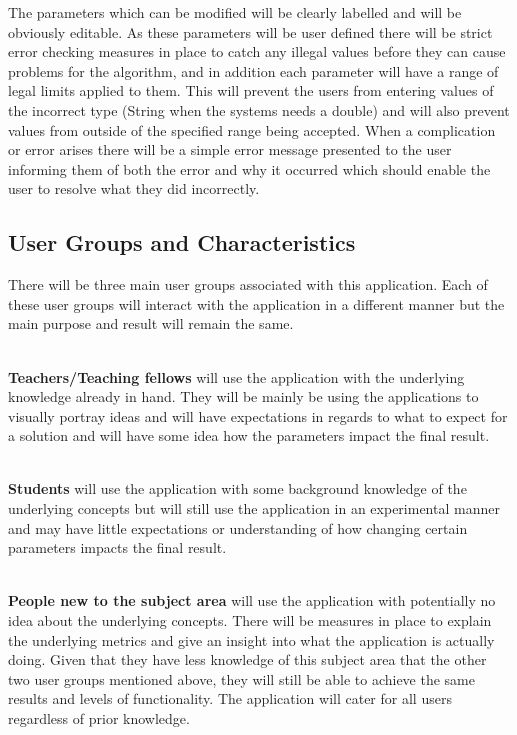 \documentclass[10pt,a4paper]{article}
\begin{document}
The parameters which can be modified will be clearly labelled and will be obviously editable. As these parameters will be user defined there will be strict error checking measures in place to catch any illegal values before they can cause problems for the algorithm, and in addition each parameter will have a range of legal limits applied to them. This will prevent the users from entering values of the incorrect type (String when the systems needs a double) and will also prevent values from outside of the specified range being accepted. When a complication or error arises there will be a simple error message presented to the user informing them of both the error and why it occurred which should enable the user to resolve what they did incorrectly.

\subsection{User Groups and Characteristics}

There will be three main user groups associated with this application. Each of these user groups will interact with the application in a different manner but the main purpose and result will remain the same.

\noindent \\
\textbf{Teachers/Teaching fellows} will use the application with the underlying knowledge already in hand. They will be mainly be using the applications to visually portray ideas and will have expectations in regards to what to expect for a solution and will have some idea how the parameters impact the final result.

\noindent \\
\textbf{Students} will use the application with some background knowledge of the underlying concepts but will still use the application in an experimental manner and may have little expectations or understanding of how changing certain parameters impacts the final result. 

\noindent \\
\textbf{People new to the subject area} will use the application with potentially no idea about the underlying concepts. There will be measures in place to explain the underlying metrics and give an insight into what the application is actually doing. Given that they have less knowledge of this subject area that the other two user groups mentioned above, they will still be able to achieve the same results and levels of functionality. The application will cater for all users regardless of prior knowledge.
\end{document}
